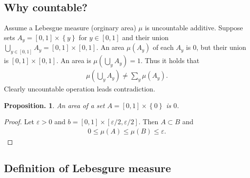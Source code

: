 \documentclass[openany, a4paper, oneside]{book}
\theoremstyle{break}
\newtheorem{prop}[thm]{Proposition.}
\theoremstyle{breakdefn}
\newcommand{\rbk}[1]{\left (#1\right)}
\newcommand{\sqbk}[1]{\left[#1\right]}
\newcommand{\cbk}[1]{\left\{#1\right\}}
\begin{document}
\subsection{Why countable?}
\label{sec-7-1-2-2}

Assume a Lebesgue measure (orginary area) $\mu$ is uncountable additive.
Suppose sets $A_y = \sqbk{0, 1} \times \cbk{y}$ for $y \in \sqbk{0, 1}$
and their union $\bigcup_{y \in \sqbk{0, 1}} A_y = \sqbk{0, 1} \times \sqbk{0, 1}$.
An area $\mu (A_y)$ of each $A_y$ is 0, but their union is $\sqbk{0, 1} \times \sqbk{0, 1}$.
An area is $\mu (\bigcup_y A_y) = 1$.
Thus it holds that
\begin{align}
 \mu \rbk{ \bigcup_y A_y}
 \neq
 \sum_y \mu (A_y).
\end{align}
Clearly uncountable operation leads contradiction.
\begin{prop}
 An area of a set $A = \sqbk{0, 1} \times \cbk{0}$ is $0$.
\end{prop}
\begin{proof}
Let $\varepsilon > 0$ and $b = \sqbk{0, 1} \times \sqbk{\varepsilon / 2, \varepsilon / 2}$.
Then $A \subset B$ and
\begin{align}
 0
 \leq
 \mu (A)
 \leq
 \mu (B)
 \leq
 \varepsilon.
\end{align}
\end{proof}
\subsection{Definition of Lebesgure measure}
\label{sec-7-1-2-3}
\end{document}
